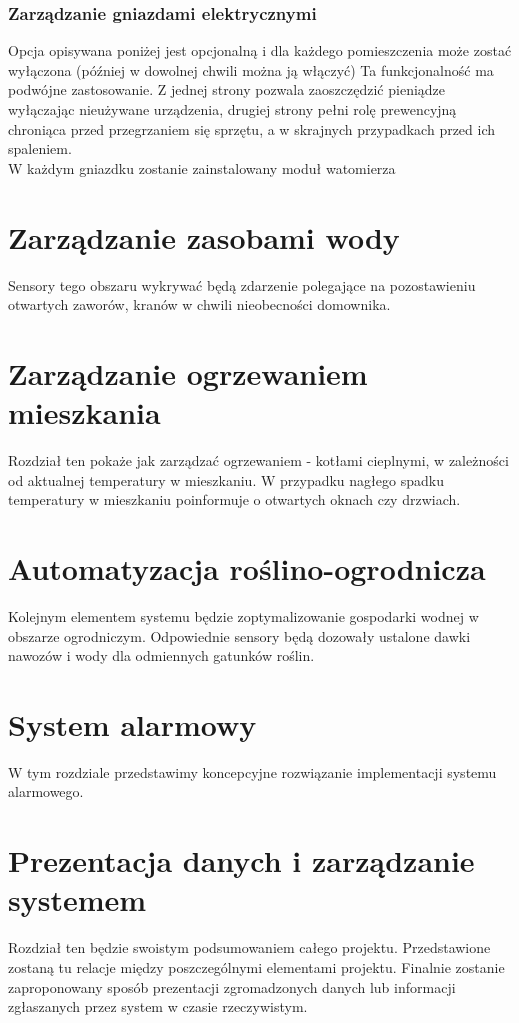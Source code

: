 \documentclass[12pt]{article} %
\begin{document}
\subsubsection{Zarządzanie gniazdami elektrycznymi}
Opcja opisywana poniżej jest opcjonalną i dla każdego pomieszczenia może zostać wyłączona (później w dowolnej chwili można ją włączyć) Ta funkcjonalność ma podwójne zastosowanie. Z jednej strony pozwala zaoszczędzić pieniądze wyłączając nieużywane urządzenia,  drugiej strony pełni rolę prewencyjną chroniąca przed przegrzaniem się sprzętu, a w skrajnych przypadkach przed ich spaleniem.
\\
W każdym gniazdku zostanie zainstalowany moduł watomierza



\section{Zarządzanie zasobami wody}
Sensory tego obszaru wykrywać będą zdarzenie polegające na pozostawieniu otwartych zaworów, kranów w chwili nieobecności domownika.

\section{Zarządzanie ogrzewaniem mieszkania}
Rozdział ten pokaże jak zarządzać ogrzewaniem - kotłami cieplnymi, w zależności od aktualnej temperatury w mieszkaniu. W przypadku nagłego spadku temperatury w mieszkaniu poinformuje o otwartych oknach czy drzwiach.

\section{Automatyzacja roślino-ogrodnicza}
Kolejnym elementem systemu będzie zoptymalizowanie gospodarki wodnej w obszarze ogrodniczym. Odpowiednie sensory będą dozowały ustalone dawki nawozów i wody dla odmiennych gatunków roślin.

\section{System alarmowy}
W tym rozdziale przedstawimy koncepcyjne rozwiązanie implementacji systemu alarmowego.

\section{Prezentacja danych i zarządzanie systemem}
Rozdział ten będzie swoistym podsumowaniem całego projektu. Przedstawione zostaną tu relacje między poszczególnymi elementami projektu. Finalnie zostanie zaproponowany sposób prezentacji zgromadzonych danych lub informacji zgłaszanych przez system w czasie rzeczywistym.
\end{document}
